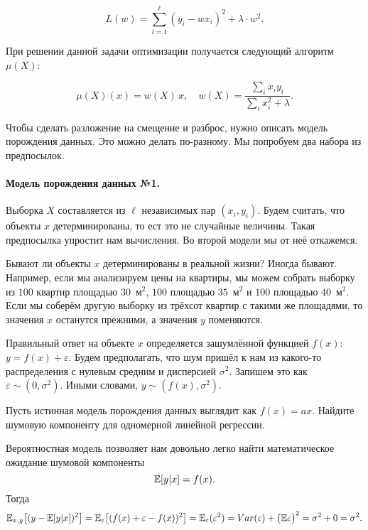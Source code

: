 \documentclass[12pt,fleqn]{article}
\begin{document}
\[
L(w) = \sum_{i=1}^\ell (y_i - w x_i)^2 + \lambda \cdot w^2. 
\]

При решении данной задачи оптимизации получается следующий алгоритм $\mu(X)$:

\[
\mu(X)(x) = w(X ) \,x, \quad w(X) = \frac{\sum_i x_i y_i}{\sum_i x_i^2 + \lambda}.
\]

Чтобы сделать разложение на смещение и разброс, нужно описать модель порождения данных. Это можно делать по-разному. Мы попробуем два набора из предпосылок.

\paragraph{Модель порождения данных №1.} 

Выборка $X$ составляется из $\ell$ независимых пар $(x_i, y_i)$. Будем считать, что объекты $x$ детерминированы, то ест это не случайные величины. Такая предпосылка упростит нам вычисления. Во второй модели мы от неё откажемся. 

Бывают ли объекты $x$ детерминированы в реальной жизни? Иногда бывают. Например, если мы анализируем цены на квартиры, мы можем собрать выборку из $100$ квартир площадью $30$~м$^2$, $100$ площадью $35$~м$^2$ и $100$ площадью $40$~м$^2.$ Если мы соберём другую выборку из трёхсот квартир с такими же площадями, то значения $x$ останутся прежними, а значения $y$ поменяются. 

Правильный ответ на объекте $x$ определяется зашумлённой функцией $f(x)$: $y = f(x) + \varepsilon$. Будем предполагать, что шум пришёл к нам из какого-то распределения с нулевым средним и дисперсией $\sigma^2$. Запишем это как $\varepsilon \sim (0, \sigma^2).$  Иными словами, $y \sim (f(x), \sigma^2).$ 

\begin{vkProblem}
Пусть истинная модель порождения данных выглядит как $f(x) = ax$. Найдите шумовую компоненту для одномерной линейной регрессии. 
\end{vkProblem}
\begin{esSolution}
    Вероятностная модель позволяет нам довольно легко найти математическое ожидание шумовой компоненты
    \[
    \mathbb{E}[y|x] = f(x).
    \]  
    Тогда
    \[
    \mathbb{E}_{x, y}\bigl[(y - \mathbb{E}[y|x] )^2\bigr] = 
    \mathbb{E}_{\varepsilon}\bigl[(f(x) + \varepsilon - f(x) )^2\bigr] = 
    \mathbb{E}_{\varepsilon} (\varepsilon^2) = Var(\varepsilon) + \bigl(\mathbb{E}\varepsilon\bigr)^2 = \sigma^2 + 0 = \sigma^2.
    \]
\end{esSolution}
\end{document}
